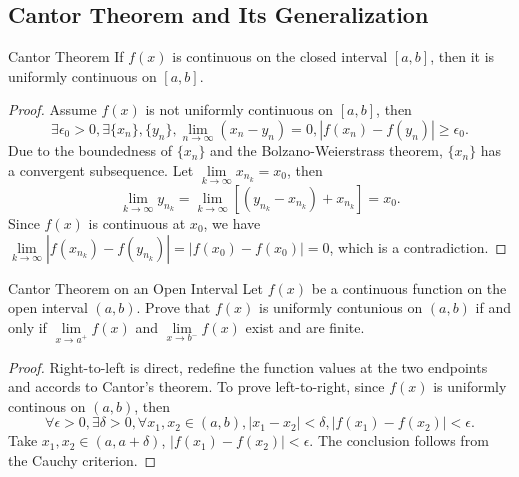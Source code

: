 \subsection{Cantor Theorem and Its Generalization}

\begin{theorem}{Cantor Theorem}{}
  If $f(x)$ is continuous on the closed interval $[a, b]$,
  then it is uniformly continuous on $[a, b]$.
\end{theorem}

\begin{proof}
  Assume $f(x)$ is not uniformly continuous on $[a, b]$,
  then
  \begin{equation}
    \exists \epsilon_0 > 0, \exists \{x_n\}, \{y_n\},
    \lim \limits _{n \rightarrow \infty} (x_n - y_n) = 0,
    |f(x_n) - f(y_n)| \geq \epsilon_0.
  \end{equation}
  Due to the boundedness of $\{x_n\}$ and the Bolzano-Weierstrass theorem,
  $\{x_n\}$ has a convergent subsequence.
  Let $\lim \limits _{k \rightarrow \infty}x_{n_k} = x_0$,
  then
  \begin{equation}
    \lim \limits _{k \rightarrow \infty} y_{n_k}
    = \lim \limits _{k \rightarrow \infty}[(y_{n_k} - x_{n_k}) + x_{n_k}] = x_0.
  \end{equation}
  Since $f(x)$ is continuous at $x_0$,
  we have $\lim \limits _{k \rightarrow \infty}|f(x_{n_k}) - f(y_{n_k})| =
  |f(x_0) - f(x_0)| = 0$, which is a contradiction.
\end{proof}

\begin{example}{Cantor Theorem on an Open Interval}{}
  Let $f(x)$ be a continuous function on the open interval $(a, b)$.
  Prove that $f(x)$ is uniformly contunious on $(a, b)$ if and only if
  $\lim \limits _{x \rightarrow a^+}f(x)$ and $\lim \limits _{x \rightarrow b^-}
  f(x)$ exist and are finite.
\end{example}

\begin{proof}
  Right-to-left is direct, redefine the function values at the two endpoints and
  accords to Cantor's theorem.
  To prove left-to-right, since $f(x)$ is uniformly continous on $(a, b)$,
  then
  \begin{equation}
    \forall \epsilon > 0, \exists \delta > 0, \forall x_1, x_2 \in (a, b),
    |x_1 - x_2| < \delta, |f(x_1) - f(x_2)| < \epsilon.
  \end{equation}
  Take $x_1, x_2 \in (a, a + \delta)$, $|f(x_1) - f(x_2)| < \epsilon$.
  The conclusion follows from the Cauchy criterion.
\end{proof}

